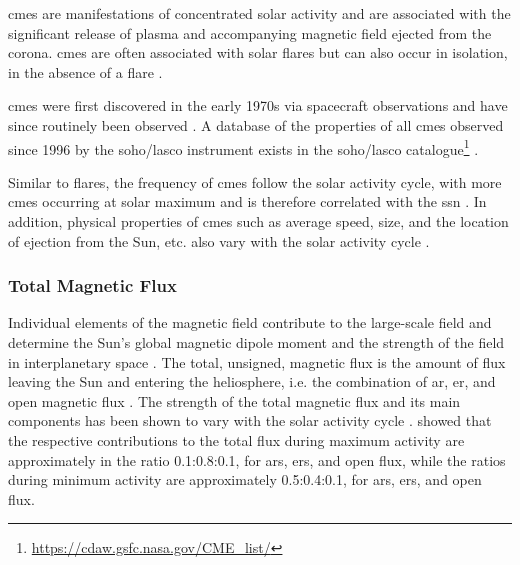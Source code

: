 \glspl{cme} are manifestations of concentrated solar activity and are associated with the significant release of plasma and accompanying magnetic field ejected from the corona. \glspl{cme} are often associated with solar flares but can also occur in isolation, in the absence of a flare \citep{hathaway_solar_2015}.

\glspl{cme} were first discovered in the early 1970s via spacecraft observations and have since routinely been observed \citep{hathaway_solar_2015}. A database of the properties of all \glspl{cme} observed since 1996 by the \gls{soho/lasco} instrument exists in the \gls{soho/lasco} catalogue\footnote{\url{https://cdaw.gsfc.nasa.gov/CME_list/}} \citep{yashiro_catalog_2004, gopalswamy_soholasco_2009}. 

Similar to flares, the frequency of \glspl{cme} follow the solar activity cycle, with more \glspl{cme} occurring at solar maximum \citep{gopalswamy_corona_2010} and is therefore correlated with the \gls{ssn} \citep{webb_solar_1994}. In addition, physical properties of \glspl{cme} such as average speed, size, and the location of ejection from the Sun, etc. also vary with the solar activity cycle \citep{yashiro_catalog_2004}.



\subsubsection*{Total Magnetic Flux}

Individual elements of the magnetic field contribute to the large-scale field and determine the Sun's global magnetic dipole moment and the strength of the field in interplanetary space  \citep{lockwood_doubling_1999, solanki_evolution_2000}. The total, unsigned, magnetic flux is the amount of flux leaving the Sun and entering the heliosphere, i.e. the combination of \gls{ar}, \gls{er}, and open magnetic flux \citep{lockwood_doubling_1999}. The strength of the total magnetic flux and its main components has been shown to vary with the solar activity cycle \citep{solanki_secular_2002, vieira_evolution_2010, chaplin_sensitivity_2019}. \citet{vieira_evolution_2010} showed that the respective contributions to the total flux during maximum activity are approximately in the ratio 0.1:0.8:0.1, for \glspl{ar}, \glspl{er}, and open flux, while the ratios during minimum activity are approximately 0.5:0.4:0.1, for \glspl{ar}, \glspl{er}, and open flux. %



